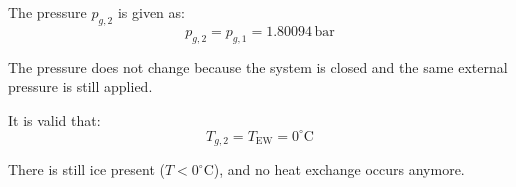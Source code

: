 The pressure \( p_{g,2} \) is given as:  
\[
p_{g,2} = p_{g,1} = 1.80094 \, \text{bar}
\]  

The pressure does not change because the system is closed and the same external pressure is still applied.  

It is valid that:  
\[
T_{g,2} = T_{\text{EW}} = 0^\circ\text{C}
\]  

There is still ice present (\( T < 0^\circ\text{C} \)), and no heat exchange occurs anymore.